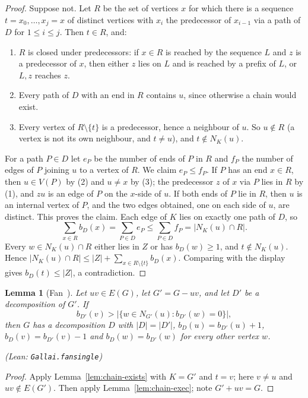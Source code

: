 \documentclass[11pt]{amsart}
\newtheorem{lemma}[theorem]{Lemma}
\theoremstyle{definition}
\theoremstyle{remark}
\renewcommand{\_}{\oldunderscore\allowbreak}
\newcommand{\leanst}[1]{\par{\raggedright\small\textup{(Lean: \texttt{#1})}\par}}
\begin{document}
\begin{proof}
Suppose not. Let $R$ be the set of vertices $x$ for which there is a sequence $t=x_0,\dots,x_j=x$
of distinct vertices with $x_i$ the predecessor of $x_{i-1}$ via a path of $D$ for $1\le i\le j$.
Then $t\in R$, and:
\begin{enumerate}[label=\textup{(\arabic*)}]
\item $R$ is closed under predecessors: if $x\in R$ is reached by the sequence $L$ and $z$ is a
predecessor of $x$, then either $z$ lies on $L$ and is reached by a prefix of $L$, or $L,z$ reaches
$z$.
\item Every path of $D$ with an end in $R$ contains $u$, since otherwise a chain would exist.
\item Every vertex of $R\setminus\{t\}$ is a predecessor, hence a neighbour of $u$. So $u\notin R$
(a vertex is not its own neighbour, and $t\ne u$), and $t\notin N_K(u)$.
\end{enumerate}
For a path $P\in D$ let $e_P$ be the number of ends of $P$ in $R$ and $f_P$ the number of edges of
$P$ joining $u$ to a vertex of $R$. We claim $e_P\le f_P$. If $P$ has an end $x\in R$, then $u\in
V(P)$ by (2) and $u\ne x$ by (3); the predecessor $z$ of $x$ via $P$ lies in $R$ by (1), and $zu$ is
an edge of $P$ on the $x$-side of $u$. If both ends of $P$ lie in $R$, then $u$ is an internal
vertex of $P$, and the two edges obtained, one on each side of $u$, are distinct. This proves the
claim. Each edge of $K$ lies on exactly one path of $D$, so
\[
\sum_{x\in R}b_D(x)=\sum_{P\in D}e_P\le\sum_{P\in D}f_P=|N_K(u)\cap R|.
\]
Every $w\in N_K(u)\cap R$ either lies in $Z$ or has $b_D(w)\ge1$, and $t\notin N_K(u)$. Hence
$|N_K(u)\cap R|\le|Z|+\sum_{x\in R\setminus\{t\}}b_D(x)$. Comparing with the display gives
$b_D(t)\le|Z|$, a contradiction.
\end{proof}

\begin{lemma}[Fan~{\cite[Lemma~3.4]{Fan05}}]\label{lem:fan}
Let $uv\in E(G)$, let $G'=G-uv$, and let $D'$ be a decomposition of $G'$. If
\[
b_{D'}(v)>\bigl|\{w\in N_{G'}(u): b_{D'}(w)=0\}\bigr|,
\]
then $G$ has a decomposition $D$ with $|D|=|D'|$, $b_D(u)=b_{D'}(u)+1$, $b_D(v)=b_{D'}(v)-1$ and
$b_D(w)=b_{D'}(w)$ for every other vertex $w$.
\leanst{Gallai.fan\_single}
\end{lemma}

\begin{proof}
Apply Lemma~\ref{lem:chain-exists} with $K=G'$ and $t=v$; here $v\ne u$ and $uv\notin E(G')$. Then
apply Lemma~\ref{lem:chain-exec}; note $G'+uv=G$.
\end{proof}
\end{document}
